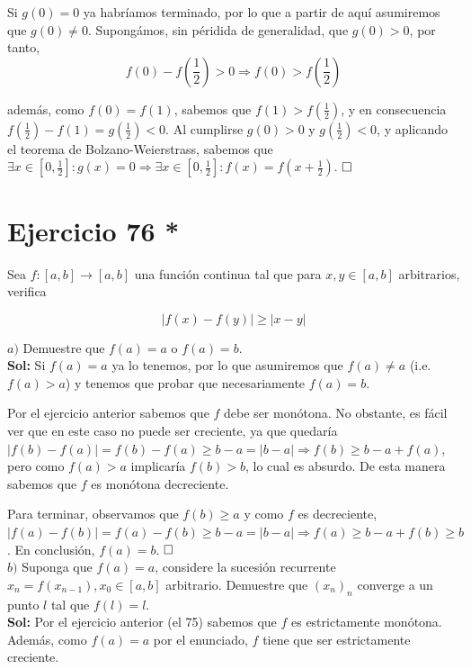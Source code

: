 \documentclass{article}
\begin{document}
Si $g(0) = 0$ ya habríamos terminado, por lo que a partir de aquí asumiremos que $g(0) \neq 0$. Supongámos, sin péridida de generalidad, que $g(0) > 0$, por tanto,  \[f(0) - f(\frac{1}{2}) > 0 \Longrightarrow f(0) > f(\frac{1}{2})\]

además, como $f(0) = f(1)$, sabemos que $f(1) > f(\frac{1}{2})$, y en consecuencia $f(\frac{1}{2}) - f(1) = g(\frac{1}{2}) < 0$. Al cumplirse $g(0) > 0$ y $g(\frac{1}{2}) < 0$, y aplicando el teorema de Bolzano-Weierstrass, sabemos que $\exists x \in [0, \frac{1}{2}]: g(x) = 0 \Longrightarrow \exists x \in [0, \frac{1}{2}]: f(x) = f(x + \frac{1}{2})$. $\hfill\square$

\newpage

\section{Ejercicio 76 *}

Sea $f : [a, b] \longrightarrow [a, b]$ una función continua tal que para $x, y \in [a, b]$ arbitrarios, verifica

\[|f(x) - f(y)| \geq |x - y|\]

$a)$ Demuestre que $f(a) = a$ o $f(a) = b$. \\

\noindent \textbf{Sol:} Si $f(a) = a$ ya lo tenemos, por lo que asumiremos que $f(a) \neq a$ (i.e. $f(a) > a$) y tenemos que probar que necesariamente $f(a) = b$.

Por el ejercicio anterior sabemos que $f$ debe ser monótona. No obstante, es fácil ver que en este caso no puede ser creciente, ya que quedaría $|f(b) - f(a)| = f(b) - f(a) \geq b - a = |b - a| \Longrightarrow f(b) \geq b - a + f(a)$, pero como $f(a) > a$ implicaría $f(b) > b$, lo cual es absurdo. De esta manera sabemos que $f$ es monótona decreciente.

Para terminar, observamos que $f(b) \geq a$ y como $f$ es decreciente, $|f(a) - f(b)| = f(a) - f(b) \geq b - a = |b - a| \Longrightarrow f(a) \geq b - a + f(b) \geq b$. En conclusión, $f(a) = b$. $\hfill\square$ \\

$b)$ Suponga que $f(a) = a$, considere la sucesión recurrente $x_n = f(x_{n - 1}), x_0 \in [a, b]$ arbitrario. Demuestre que $(x_n)_n$ converge a un punto $l$ tal que $f(l) = l$. \\

\noindent \textbf{Sol:} Por el ejercicio anterior (el 75) sabemos que $f$ es estrictamente monótona. Además, como $f(a) = a$ por el enunciado, $f$ tiene que ser estrictamente creciente.
\end{document}
